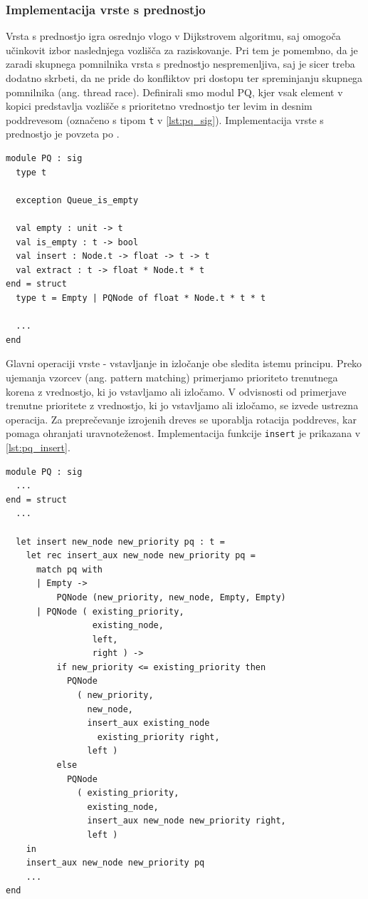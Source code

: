 \documentclass[mat1, tisk]{fmfdelo}
\begin{document}
\subsubsection{Implementacija vrste s prednostjo}

Vrsta s prednostjo igra osrednjo vlogo v Dijkstrovem algoritmu, saj omogoča učinkovit izbor naslednjega vozlišča za raziskovanje. 
Pri tem je pomembno, da je zaradi skupnega pomnilnika vrsta s prednostjo nespremenljiva, saj je sicer treba
dodatno skrbeti, da ne pride do konfliktov pri dostopu ter spreminjanju skupnega pomnilnika (ang. thread race). 
Definirali smo modul PQ, kjer vsak element v kopici predstavlja vozlišče s prioritetno vrednostjo ter levim in desnim poddrevesom
(označeno s tipom \texttt{t} v \ref{lst:pq_sig}). Implementacija vrste s prednostjo je povzeta po \cite{okasaki1996}.

\begin{lstlisting}[label=lst:pq_sig]
module PQ : sig
  type t

  exception Queue_is_empty

  val empty : unit -> t
  val is_empty : t -> bool
  val insert : Node.t -> float -> t -> t
  val extract : t -> float * Node.t * t
end = struct
  type t = Empty | PQNode of float * Node.t * t * t

  ...
end
\end{lstlisting}

Glavni operaciji vrste - vstavljanje in izločanje obe sledita istemu principu. Preko ujemanja vzorcev (ang. pattern matching)
primerjamo prioriteto trenutnega korena z vrednostjo, ki jo vstavljamo ali izločamo. V odvisnosti od primerjave trenutne
prioritete z vrednostjo, ki jo vstavljamo ali izločamo, se izvede ustrezna operacija. Za preprečevanje izrojenih dreves
se uporablja rotacija poddreves, kar pomaga ohranjati uravnoteženost. Implementacija funkcije \texttt{insert} je prikazana
v \ref{lst:pq_insert}.

\begin{lstlisting}[label=lst:pq_insert]
module PQ : sig
  ...
end = struct
  ...

  let insert new_node new_priority pq : t =
    let rec insert_aux new_node new_priority pq =
      match pq with
      | Empty -> 
          PQNode (new_priority, new_node, Empty, Empty)
      | PQNode ( existing_priority, 
                 existing_node, 
                 left, 
                 right ) ->
          if new_priority <= existing_priority then
            PQNode
              ( new_priority,
                new_node,
                insert_aux existing_node 
                  existing_priority right,
                left )
          else
            PQNode
              ( existing_priority,
                existing_node,
                insert_aux new_node new_priority right,
                left )
    in
    insert_aux new_node new_priority pq
    ...
end
\end{lstlisting}
\end{document}
